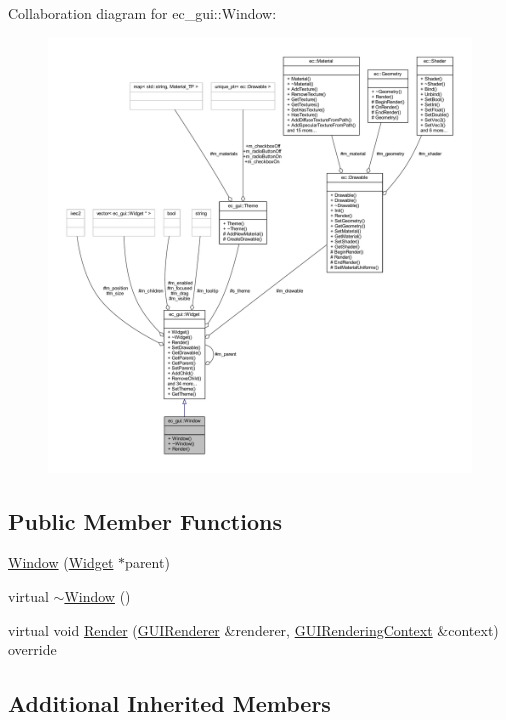 Collaboration diagram for ec\+\_\+gui\+:\+:Window\+:
\nopagebreak
\begin{figure}[H]
\begin{center}
\leavevmode
\includegraphics[width=350pt]{classec__gui_1_1_window__coll__graph}
\end{center}
\end{figure}
\subsection*{Public Member Functions}
\begin{DoxyCompactItemize}
\item 
\mbox{\hyperlink{classec__gui_1_1_window_a7841453949917ebed1df39cbd1f77532}{Window}} (\mbox{\hyperlink{classec__gui_1_1_widget}{Widget}} $\ast$parent)
\item 
virtual \mbox{\hyperlink{classec__gui_1_1_window_a9a8b81905961bb2a8761ed1770253b20}{$\sim$\+Window}} ()
\item 
virtual void \mbox{\hyperlink{classec__gui_1_1_window_ab8c5a4f6f2104d7619f90362d0c43385}{Render}} (\mbox{\hyperlink{classec__gui_1_1_g_u_i_renderer}{G\+U\+I\+Renderer}} \&renderer, \mbox{\hyperlink{classec__gui_1_1_g_u_i_rendering_context}{G\+U\+I\+Rendering\+Context}} \&context) override
\end{DoxyCompactItemize}
\subsection*{Additional Inherited Members}


